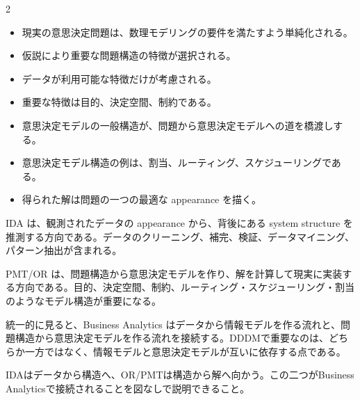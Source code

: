 \begin{multicols}{2}

\footnotesize

\raggedcolumns


\begin{itemize}
\item 現実の意思決定問題は、数理モデリングの要件を満たすよう単純化される。
\item 仮説により重要な問題構造の特徴が選択される。
\item データが利用可能な特徴だけが考慮される。
\item 重要な特徴は目的、決定空間、制約である。
\item 意思決定モデルの一般構造が、問題から意思決定モデルへの道を橋渡しする。
\item 意思決定モデル構造の例は、割当、ルーティング、スケジューリングである。
\item 得られた解は問題の一つの最適な appearance を描く。
\end{itemize}

IDA は、観測されたデータの appearance から、背後にある system structure を推測する方向である。データのクリーニング、補完、検証、データマイニング、パターン抽出が含まれる。\par

PMT/OR は、問題構造から意思決定モデルを作り、解を計算して現実に実装する方向である。目的、決定空間、制約、ルーティング・スケジューリング・割当のようなモデル構造が重要になる。\par

統一的に見ると、Business Analytics はデータから情報モデルを作る流れと、問題構造から意思決定モデルを作る流れを接続する。DDDMで重要なのは、どちらか一方ではなく、情報モデルと意思決定モデルが互いに依存する点である。\par

IDAはデータから構造へ、OR/PMTは構造から解へ向かう。この二つがBusiness Analyticsで接続されることを図なしで説明できること。\par


\end{multicols}
